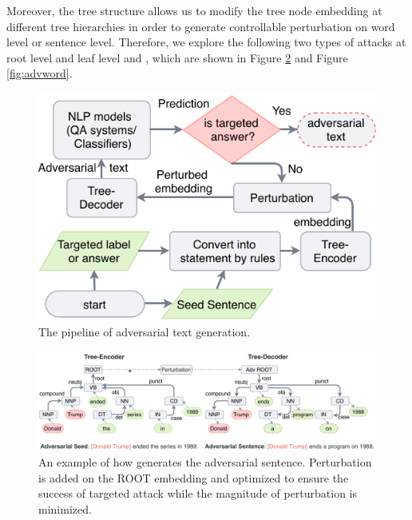 
Moreover, the tree structure allows us to modify the tree node embedding at different tree hierarchies in order to generate controllable perturbation on word level or sentence level. Therefore, we explore the following two types of attacks at root level and leaf level \advcodecsent and \advcodecword, which are shown in Figure \ref{fig:advsent} and Figure \ref{fig:advword}.



\begin{figure}[t]
    \centering
    \includegraphics[width=\linewidth]{body/pipelinefull.pdf}
    \caption{The pipeline of adversarial text generation.}
    \label{fig:pipeline}
    \vspace{-3mm}
\end{figure}

 \begin{figure}[t]
    \includegraphics[trim=0cm 0cm 0cm 0cm,clip,width=1\linewidth]{body/pipelinesent.pdf}
    \caption{\small An example of how \advcodecsent generates the adversarial sentence. Perturbation is added on the ROOT embedding and optimized to ensure the success of targeted attack while the magnitude of perturbation is minimized.} %
    \vspace{-0.3cm}
    \label{fig:advsent}
\end{figure}


